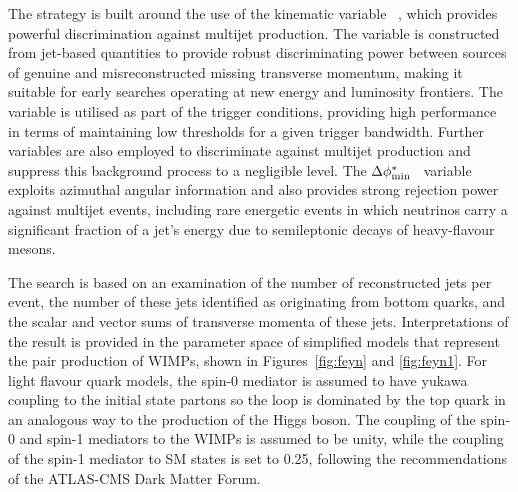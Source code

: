 The strategy is built around the use of the kinematic variable
\alphat~\cite{Randall:2008rw, RA1Paper}, which provides powerful
discrimination against multijet production. The \alphat variable is
constructed from jet-based quantities to provide robust discriminating
power between sources of genuine and misreconstructed missing
transverse momentum, making it suitable for early searches operating
at new energy and luminosity frontiers. The \alphat variable is
utilised as part of the trigger conditions, providing high performance
in terms of maintaining low thresholds for a given trigger
bandwidth. Further variables are also employed to discriminate against
multijet production and suppress this background process to a
negligible level. The $\Delta\phi^{*}_{\rm min}$~\cite{RA1Paper}
variable exploits azimuthal angular information and also provides
strong rejection power against multijet events, including rare
energetic events in which neutrinos carry a significant fraction of a
jet's energy due to semileptonic decays of heavy-flavour mesons.


The search is based on an examination of the number of reconstructed
jets per event, the number of these jets identified as originating
from bottom quarks, and the scalar and vector sums of transverse
momenta of these jets. 
Interpretations of the result %
is provided in the parameter space of simplified
models that represent the
pair production of WIMPs, shown in Figures~\ref{fig:feyn} and \ref{fig:feyn1}.
For light flavour quark models, the spin-0 mediator is assumed to have yukawa coupling to the initial state partons so the loop is dominated by the top quark in an analogous way to the production of the Higgs boson. The coupling of the spin-0 and spin-1 mediators to the WIMPs is assumed to be unity, while the coupling of the spin-1 mediator to SM states is set to 0.25, following the recommendations of the ATLAS-CMS Dark Matter Forum. 

